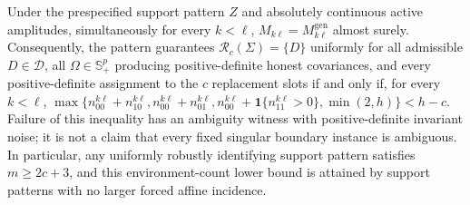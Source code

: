 Under the prespecified support pattern \(Z\) and absolutely continuous active amplitudes, simultaneously for every \(k<\ell\), \(M_{k\ell}=M_{k\ell}^{\mathrm{gen}}\) almost surely. Consequently, the pattern guarantees \(\mathcal R_c(\Sigma)=\{D\}\) uniformly for all admissible \(D\in\mathcal D\), all \(\Omega\in\mathbb S_{+}^{p}\) producing positive-definite honest covariances, and every positive-definite assignment to the \(c\) replacement slots if and only if, for every \(k<\ell\), \(\max\{n_{00}^{k\ell}+n_{10}^{k\ell},n_{00}^{k\ell}+n_{01}^{k\ell},n_{00}^{k\ell}+\mathbf 1\{n_{11}^{k\ell}>0\},\min(2,h)\}<h-c\). Failure of this inequality has an ambiguity witness with positive-definite invariant noise; it is not a claim that every fixed singular boundary instance is ambiguous. In particular, any uniformly robustly identifying support pattern satisfies \(m\ge2c+3\), and this environment-count lower bound is attained by support patterns with no larger forced affine incidence.